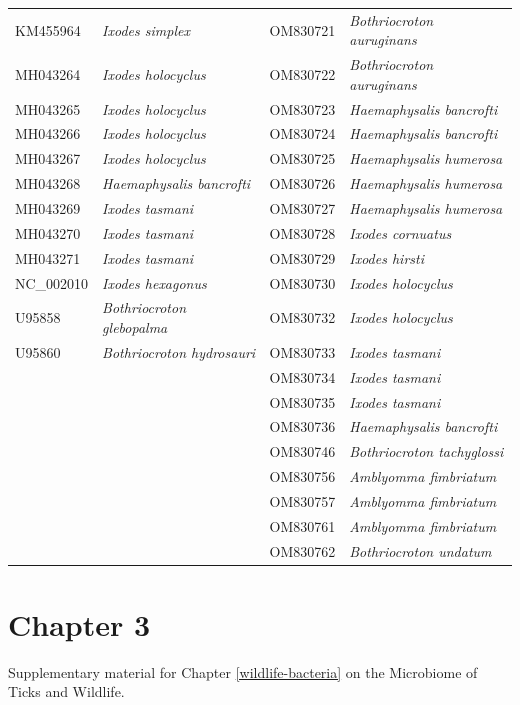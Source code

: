 \documentclass[a4paper, nobind]{templates/ociamthesis}
\begin{document}
\begin{longtable}[t]{l>{}l|l>{}l}
KM455964 & \em{Ixodes simplex} & OM830721 & \em{Bothriocroton auruginans}\\
MH043264 & \em{Ixodes holocyclus} & OM830722 & \em{Bothriocroton auruginans}\\
MH043265 & \em{Ixodes holocyclus} & OM830723 & \em{Haemaphysalis bancrofti}\\
MH043266 & \em{Ixodes holocyclus} & OM830724 & \em{Haemaphysalis bancrofti}\\
MH043267 & \em{Ixodes holocyclus} & OM830725 & \em{Haemaphysalis humerosa}\\
MH043268 & \em{Haemaphysalis bancrofti} & OM830726 & \em{Haemaphysalis humerosa}\\
MH043269 & \em{Ixodes tasmani} & OM830727 & \em{Haemaphysalis humerosa}\\
MH043270 & \em{Ixodes tasmani} & OM830728 & \em{Ixodes cornuatus}\\
MH043271 & \em{Ixodes tasmani} & OM830729 & \em{Ixodes hirsti}\\
NC\_002010 & \em{Ixodes hexagonus} & OM830730 & \em{Ixodes holocyclus}\\
U95858 & \em{Bothriocroton glebopalma} & OM830732 & \em{Ixodes holocyclus}\\
U95860 & \em{Bothriocroton hydrosauri} & OM830733 & \em{Ixodes tasmani}\\
 & \em{} & OM830734 & \em{Ixodes tasmani}\\
 & \em{} & OM830735 & \em{Ixodes tasmani}\\
 & \em{} & OM830736 & \em{Haemaphysalis bancrofti}\\
 & \em{} & OM830746 & \em{Bothriocroton tachyglossi}\\
 & \em{} & OM830756 & \em{Amblyomma fimbriatum}\\
 & \em{} & OM830757 & \em{Amblyomma fimbriatum}\\
 & \em{} & OM830761 & \em{Amblyomma fimbriatum}\\
 & \em{} & OM830762 & \em{Bothriocroton undatum}\\*
\end{longtable}
\endgroup{}

\newpage

\hypertarget{ch3supp}{%
\section{Chapter 3}\label{ch3supp}}

Supplementary material for Chapter \ref{wildlife-bacteria} on the Microbiome of Ticks and Wildlife.
\end{document}
